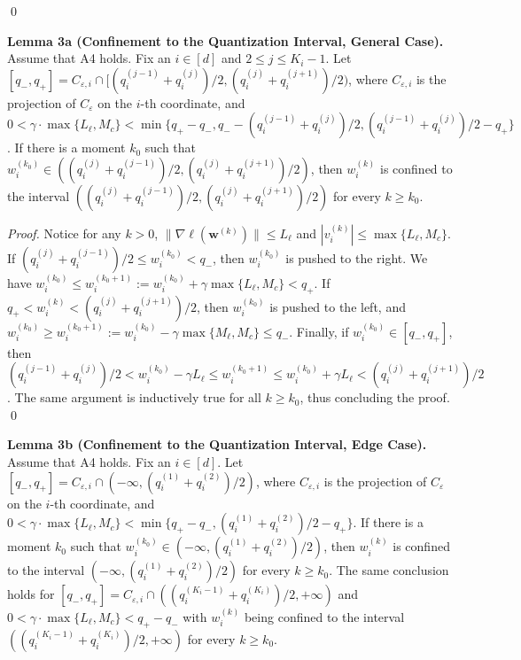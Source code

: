 \documentclass[10pt,a4paper]{article}
\begin{document}
\qed

\newpage
\textbf{Lemma 3a (Confinement to the Quantization Interval, General Case).} Assume that A4 holds. Fix an $i\in[d]$ and $2\leq j\leq K_i-1$. Let $[q_-, q_+]=C_{\varepsilon,i} \cap [(q_i^{(j-1)}+q_i^{(j)})/2, (q_i^{(j)}+q_i^{(j+1)})/2)$, where $C_{\varepsilon,i}$ is the projection of $C_\varepsilon$ on the $i$-th coordinate, and $0<\gamma\cdot \max\{L_\ell, M_c\}< \min\{q_+-q_-, q_--(q_i^{(j-1)}+q_i^{(j)})/2, (q_i^{(j-1)}+q_i^{(j)})/2-q_+\}$. If there is a moment $k_0$ such that $w_i^{(k_0)}\in ((q_i^{(j)}+q_i^{(j-1)})/2, (q_i^{(j)}+q_i^{(j+1)})/2)$, then $w^{(k)}_i$ is confined to the interval $((q_i^{(j)}+q_i^{(j-1)})/2, (q_i^{(j)}+q_i^{(j+1)})/2)$ for every $k\geq k_0$. 

\textit{Proof.} Notice for any $k>0$, $\lVert \nabla\ell(\mathbf{w}^{(k)})\rVert\leq L_\ell$ and $|v_i^{(k)}|\leq \max\{L_\ell,M_c\}$. If $(q_i^{(j)}+q_i^{(j-1)})/2\leq w^{(k_0)}_i< q_-$, then $w_i^{(k_0)}$ is pushed to the right. We have $w_i^{(k_0)}\leq w_i^{(k_0+1)}:=w_i^{(k_0)}+\gamma \max\{L_\ell, M_c\}< q_+$. If $q_+< w_i^{(k)}<(q_i^{(j)}+q_i^{(j+1)})/2$, then $w_i^{(k_0)}$ is pushed to the left, and $w_i^{(k_0)}\geq w_i^{(k_0+1)}:= w_i^{(k_0)}-\gamma\max\{M_\ell, M_c\}\leq q_-$. Finally, if $w_i^{(k_0)}\in [q_-, q_+]$, then $(q_i^{(j-1)}+q_i^{(j)})/2<w_i^{(k_0)}-\gamma L_\ell\leq w_i^{(k_0+1)}\leq w_i^{(k_0)}+\gamma L_\ell<(q_i^{(j)}+q_i^{(j+1)})/2$. The same argument is inductively true for all $k\geq k_0$, thus concluding the proof. \qed

\textbf{Lemma 3b (Confinement to the Quantization Interval, Edge Case).} Assume that A4 holds. Fix an $i\in[d]$. Let $[q_-, q_+] = C_{\varepsilon,i} \cap (-\infty, (q_i^{(1)}+q_i^{(2)})/2)$, where $C_{\varepsilon,i}$ is the projection of $C_\varepsilon$ on the $i$-th coordinate, and $0<\gamma\cdot \max\{L_\ell, M_c\}< \min\{q_+-q_-, (q_i^{(1)}+q_i^{(2)})/2-q_+\}$. If there is a moment $k_0$ such that $w_i^{(k_0)}\in(-\infty, (q_i^{(1)}+q_i^{(2)})/2)$, then $w^{(k)}_i$ is confined to the interval $(-\infty, (q_i^{(1)}+q_i^{(2)})/2)$ for every $k\geq k_0$. The same conclusion holds for $[q_-, q_+] = C_{\varepsilon,i} \cap ((q_i^{(K_i-1)}+q_i^{(K_i)})/2,+\infty)$ and $0<\gamma\cdot \max\{L_\ell, M_c\}<q_+-q_-$ with $w^{(k)}_i$ being confined to the interval $((q_i^{(K_i-1)}+q_i^{(K_i)})/2, +\infty)$ for every $k\geq k_0$.
\end{document}
